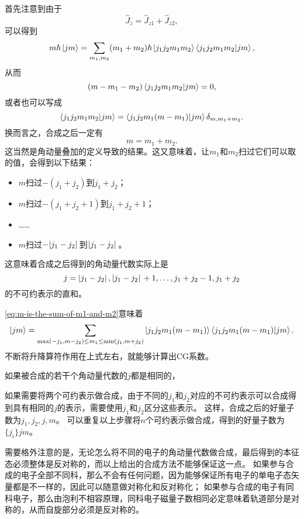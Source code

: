 \documentclass[UTF8, a4paper]{ctexart}
\begin{document}
首先注意到由于
\[
    \hat{J}_z = \hat{J}_{z1} + \hat{J}_{z2},
\]
可以得到
\[
    m \hbar \ket{jm} = \sum_{m_1, m_2} (m_1 + m_2) \hbar \ket{j_1 j_2 m_1 m_2} \braket{j_1 j_2 m_1 m_2}{j m}, 
\]
从而
\[
    (m - m_1 - m_2) \braket{j_1 j_2 m_1 m_2}{j m} = 0, 
\]
或者也可以写成
\begin{equation}
    \braket{j_1 j_2 m_1 m_2}{j m} = \braket{j_1 j_2 m_1 (m - m_1)}{j m} \delta_{m, m_1 + m_2}.
    \label{eq:m-is-the-sum-of-m1-and-m2}
\end{equation}
换而言之，合成之后一定有
\begin{equation}
    m = m_1 + m_2.
\end{equation}
这当然是角动量叠加的定义导致的结果。这又意味着，让$m_1$和$m_2$扫过它们可以取的值，会得到以下结果：
\begin{itemize}
    \item $m$扫过$-(j_1 + j_2)$到$j_1 + j_2$；
    \item $m$扫过$-(j_1 + j_2 + 1)$到$j_1 + j_2 + 1$；
    \item ……
    \item $m$扫过$-\abs*{j_1 - j_2}$到$\abs*{j_1 - j_2}$。
\end{itemize}
这意味着合成之后得到的角动量代数实际上是
\begin{equation}
    j = \abs*{j_1 - j_2}, \abs*{j_1 - j_2} + 1, \ldots, j_1 + j_2 - 1, j_1 + j_2
\end{equation}
的不可约表示的直和。

\eqref{eq:m-is-the-sum-of-m1-and-m2}意味着
\[
    \ket{jm} = \sum_{\max(-j_1, m-j_2) \leq m_1 \leq \min(j_1, m+j_2)} \ket{j_1 j_2 m_1 (m - m_1)} \braket{j_1 j_2 m_1 (m - m_1)}{jm}.
\]
不断将升降算符作用在上式左右，就能够计算出CG系数。

如果被合成的若干个角动量代数的$j$都是相同的，

如果需要将两个可约表示做合成，由于不同的$j_1$和$j_2$对应的不可约表示可以合成得到具有相同的$j$的表示，需要使用$j_1$和$j_2$区分这些表示。
这样，合成之后的好量子数为$j_1, j_2, j, m$。
可以重复以上步骤将$n$个可约表示做合成，得到的好量子数为$\{j_i\} j m$。

需要格外注意的是，无论怎么将不同的电子的角动量代数做合成，最后得到的本征态必须整体是反对称的，而以上给出的合成方法不能够保证这一点。
如果参与合成的电子全部不同科，那么不会有任何问题，因为能够保证所有电子的单电子态矢量都是不一样的，因此可以随意做对称化和反对称化；
如果参与合成的电子有同科电子，那么由泡利不相容原理，同科电子磁量子数相同必定意味着轨道部分是对称的，从而自旋部分必须是反对称的。
\end{document}
